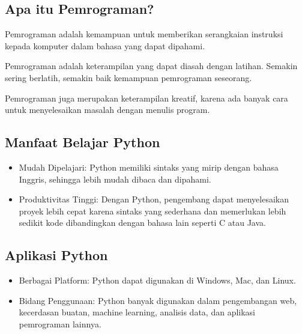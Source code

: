 \documentclass{article}
\begin{document}
\subsection{Apa itu Pemrograman?}
Pemrograman adalah kemampuan untuk memberikan serangkaian instruksi kepada komputer dalam bahasa yang dapat dipahami.

Pemrograman adalah keterampilan yang dapat diasah dengan latihan. Semakin sering berlatih, semakin baik kemampuan pemrograman seseorang.

Pemrograman juga merupakan keterampilan kreatif, karena ada banyak cara untuk menyelesaikan masalah dengan menulis program.

\subsection{Manfaat Belajar Python}
\begin{itemize}
    \item Mudah Dipelajari: Python memiliki sintaks yang mirip dengan bahasa Inggris, sehingga lebih mudah dibaca dan dipahami.
    \item Produktivitas Tinggi: Dengan Python, pengembang dapat menyelesaikan proyek lebih cepat karena sintaks yang sederhana dan memerlukan lebih sedikit kode dibandingkan dengan bahasa lain seperti C atau Java.
\end{itemize}

\subsection{Aplikasi Python}
\begin{itemize}
    \item Berbagai Platform: Python dapat digunakan di Windows, Mac, dan Linux.
    \item Bidang Penggunaan: Python banyak digunakan dalam pengembangan web, kecerdasan buatan, machine learning, analisis data, dan aplikasi pemrograman lainnya.
\end{itemize}
\end{document}
